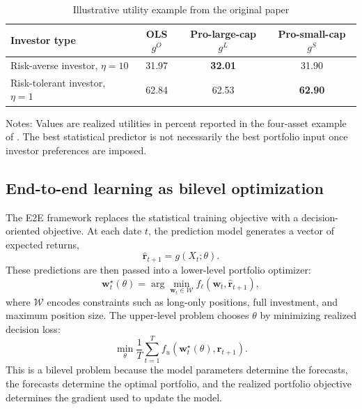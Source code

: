 \documentclass[11pt]{article}
\begin{document}
\begin{table}[H]
\centering
\caption{Illustrative utility example from the original paper}
\label{tab:theory_example}
\begin{threeparttable}
\begin{tabular}{lccc}
\toprule
Investor type & OLS $g^O$ & Pro-large-cap $g^L$ & Pro-small-cap $g^S$ \\
\midrule
Risk-averse investor, $\eta=10$ & 31.97 & \textbf{32.01} & 31.90 \\
Risk-tolerant investor, $\eta=1$ & 62.84 & 62.53 & \textbf{62.90} \\
\bottomrule
\end{tabular}
\begin{tablenotes}
\small
\item Notes: Values are realized utilities in percent reported in the four-asset example of \citet{wang2026mlmm}. The best statistical predictor is not necessarily the best portfolio input once investor preferences are imposed.
\end{tablenotes}
\end{threeparttable}
\end{table}

\subsection{End-to-end learning as bilevel optimization}

The E2E framework replaces the statistical training objective with a decision-oriented objective. At each date $t$, the prediction model generates a vector of expected returns,
\[
    \widehat{\bm r}_{t+1}=g(X_t;\theta).
\]
These predictions are then passed into a lower-level portfolio optimizer:
\begin{equation}
    \bm w_t^\star(\theta)
    =
    \arg\min_{\bm w_t\in\mathcal{W}}
    f_{\ell}\left(\bm w_t,\widehat{\bm r}_{t+1}\right),
    \label{eq:lower}
\end{equation}
where $\mathcal{W}$ encodes constraints such as long-only positions, full investment, and maximum position size. The upper-level problem chooses $\theta$ by minimizing realized decision loss:
\begin{equation}
    \min_\theta \frac{1}{T}\sum_{t=1}^{T}
    f_u\left(\bm w_t^\star(\theta), \bm r_{t+1}\right).
    \label{eq:e2e_general}
\end{equation}
This is a bilevel problem because the model parameters determine the forecasts, the forecasts determine the optimal portfolio, and the realized portfolio objective determines the gradient used to update the model.
\end{document}
